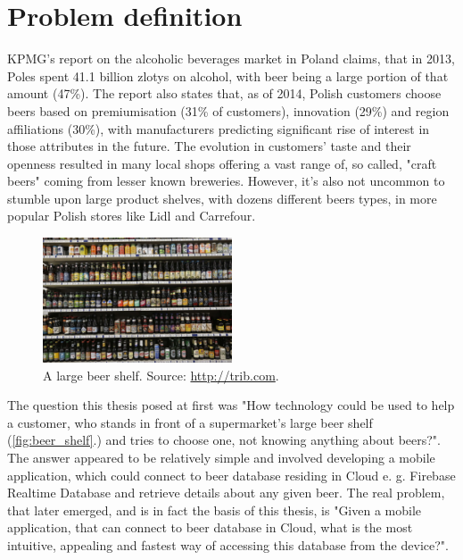 \documentclass[11pt]{article}
\begin{document}
\thispagestyle{empty}
\tableofcontents
\clearpage
\setcounter{page}{1}

\section{Problem definition} \label{problem_definition}
KPMG's report on the alcoholic beverages market in Poland \cite{kpmg_alco} claims, that in 2013, Poles spent 41.1 billion zlotys on alcohol, with beer being a large portion of that amount (47\%). The report also states that, as of 2014, Polish customers choose beers based on premiumisation (31\% of customers), innovation (29\%) and region affiliations (30\%), with manufacturers predicting significant rise of interest in those attributes in the future. The evolution in customers' taste and their openness resulted in many local shops offering a vast range of, so called, "craft beers" coming from lesser known breweries. However, it's also not uncommon to stumble upon large product shelves, with dozens different beers types, in more popular Polish stores like Lidl and Carrefour.\\

\begin{figure}[h]
\includegraphics[width=0.5\textwidth]{beer_shelf}
\centering
\caption{A large beer shelf. Source: \protect \url{http://trib.com}.}
\label{fig:beer_shelf}
\end{figure}

The question this thesis posed at first was "How technology could be used to help a customer, who stands in front of a supermarket's large beer shelf (\autoref{fig:beer_shelf}.) and tries to choose one, not knowing anything about beers?". The answer appeared to be relatively simple and involved developing a mobile application, which could connect to beer database residing in Cloud e. g. Firebase Realtime Database and retrieve details about any given beer. The real problem, that later emerged, and is in fact the basis of this thesis, is "Given a mobile application, that can connect to beer database in Cloud, what is the most intuitive, appealing and fastest way of accessing this database from the device?".
\clearpage
\end{document}
